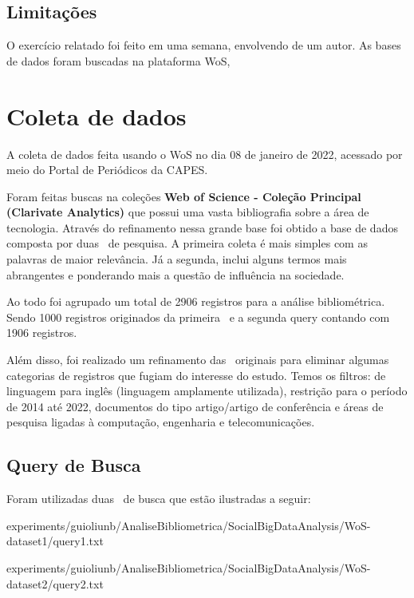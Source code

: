 \subsection{Limitações} O exercício relatado foi feito em uma semana, envolvendo de um autor. As bases de dados foram buscadas na plataforma WoS,


\section{Coleta de dados\label{MASSA:coleta}}

A coleta de dados feita usando o WoS no dia 08 de janeiro de 2022, acessado por meio do Portal de Periódicos da CAPES.

Foram feitas buscas na coleções \textbf{Web of Science - Coleção Principal (Clarivate Analytics) } que possui uma vasta bibliografia sobre a área de tecnologia. Através do refinamento nessa grande base foi obtido a base de dados composta por duas \querys\ de pesquisa. A primeira coleta é mais simples com as palavras de maior relevância. Já a segunda, inclui alguns termos mais abrangentes e ponderando mais a questão de influência na sociedade. 

Ao todo foi agrupado um total de 2906 registros para a análise bibliométrica. Sendo 1000 registros originados da primeira \query\ e a segunda query contando com 1906 registros.

Além disso, foi realizado um refinamento das \query\ originais para eliminar algumas categorias de registros que fugiam do interesse do estudo. Temos os filtros: de linguagem para inglês (linguagem amplamente utilizada), restrição para o período de 2014 até 2022, documentos do tipo artigo/artigo de conferência e áreas de pesquisa ligadas à computação, engenharia e telecomunicações.

\subsection{Query de Busca}

Foram utilizadas duas \querys\ de busca que estão ilustradas a seguir: %


{experiments/guioliunb/AnaliseBibliometrica/SocialBigDataAnalysis/WoS-dataset1/query1.txt}


{experiments/guioliunb/AnaliseBibliometrica/SocialBigDataAnalysis/WoS-dataset2/query2.txt}

